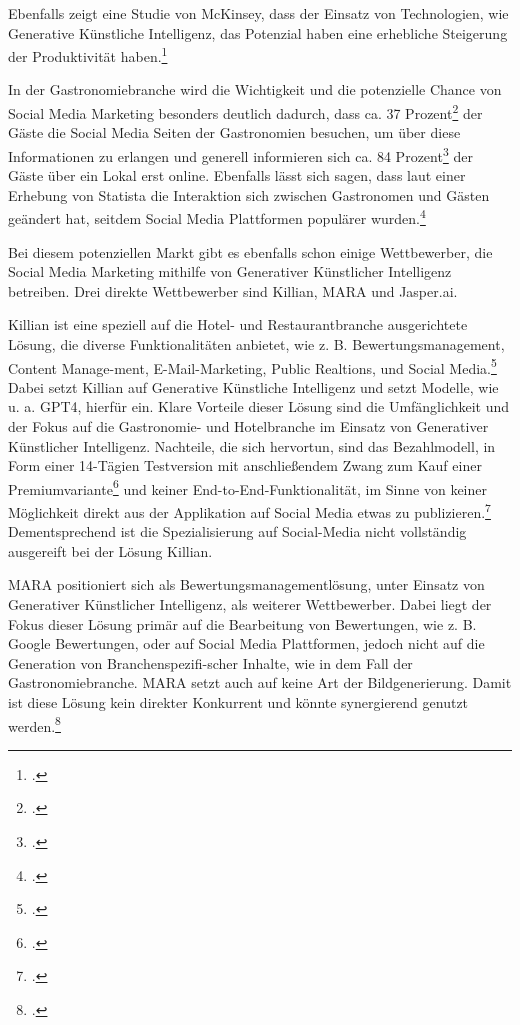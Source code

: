 Ebenfalls zeigt eine Studie von McKinsey, dass der Einsatz von Technologien, wie Generative Künstliche Intelligenz, das Potenzial haben eine erhebliche Steigerung der Produktivität haben.\footcite{mckinsey_genai_marketing}

In der Gastronomiebranche wird die Wichtigkeit und die potenzielle Chance von Social Media Marketing besonders deutlich dadurch, dass ca. 37 Prozent\footcite{apicbase_gastro_fakten} der Gäste die Social Media Seiten der Gastronomien besuchen, um über diese Informationen zu erlangen und generell informieren sich ca. 84 Prozent\footcite{g_wie_gastro_trends_2024} der Gäste über ein Lokal erst online.
Ebenfalls lässt sich sagen, dass laut einer Erhebung von Statista die Interaktion sich zwischen Gastronomen und Gästen geändert hat, seitdem Social Media Plattformen populärer wurden.\footcite{statista_social_media_gastgewerbe}

Bei diesem potenziellen Markt gibt es ebenfalls schon einige Wettbewerber, die Social Media Marketing mithilfe von Generativer Künstlicher Intelligenz betreiben.
Drei direkte Wettbewerber sind Killian, MARA und Jasper.ai.

Killian ist eine speziell auf die Hotel- und Restaurantbranche ausgerichtete Lösung, die diverse Funktionalitäten anbietet, wie z. B. Bewertungsmanagement, Content Manage-ment, E-Mail-Marketing, Public Realtions, und Social Media.\footcite{kilian_ai_produkt}
Dabei setzt Killian auf Generative Künstliche Intelligenz und setzt Modelle, wie u. a. GPT4, hierfür ein.
Klare Vorteile dieser Lösung sind die Umfänglichkeit und der Fokus auf die Gastronomie- und Hotelbranche im Einsatz von Generativer Künstlicher Intelligenz.
Nachteile, die sich hervortun, sind das Bezahlmodell, in Form einer 14-Tägien Testversion mit anschließendem Zwang zum Kauf einer Premiumvariante\footcite{kilian_ai_preise} und keiner End-to-End-Funktionalität, im Sinne von keiner Möglichkeit direkt aus der Applikation auf Social Media etwas zu publizieren.\footcite{kilian_ai_funktionen}
Dementsprechend ist die Spezialisierung auf Social-Media nicht vollständig ausgereift bei der Lösung Killian.

MARA positioniert sich als Bewertungsmanagementlösung, unter Einsatz von Generativer Künstlicher Intelligenz, als weiterer Wettbewerber.
Dabei liegt der Fokus dieser Lösung primär auf die Bearbeitung von Bewertungen, wie z. B. Google Bewertungen, oder auf Social Media Plattformen, jedoch nicht auf die Generation von Branchenspezifi-scher Inhalte, wie in dem Fall der Gastronomiebranche.
MARA setzt auch auf keine Art der Bildgenerierung.
Damit ist diese Lösung kein direkter Konkurrent und könnte synergierend genutzt werden.\footcite{mara_solutions_features}


